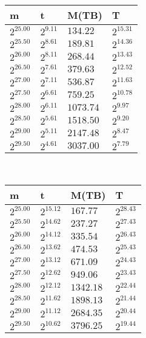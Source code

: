 \begin{tabular}{llll}
m & t & M(TB) & T \\ \hline
$2^{25.00}$ & $2^{9.11}$ & $134.22$ & $2^{15.31}$ \\
$2^{25.50}$ & $2^{8.61}$ & $189.81$ & $2^{14.36}$ \\
$2^{26.00}$ & $2^{8.11}$ & $268.44$ & $2^{13.43}$ \\
$2^{26.50}$ & $2^{7.61}$ & $379.63$ & $2^{12.52}$ \\
$2^{27.00}$ & $2^{7.11}$ & $536.87$ & $2^{11.63}$ \\
$2^{27.50}$ & $2^{6.61}$ & $759.25$ & $2^{10.78}$ \\
$2^{28.00}$ & $2^{6.11}$ & $1073.74$ & $2^{9.97}$ \\
$2^{28.50}$ & $2^{5.61}$ & $1518.50$ & $2^{9.20}$ \\
$2^{29.00}$ & $2^{5.11}$ & $2147.48$ & $2^{8.47}$ \\
$2^{29.50}$ & $2^{4.61}$ & $3037.00$ & $2^{7.79}$ \\
\end{tabular}
 \ 
\begin{tabular}{llll}
m & t & M(TB) & T \\ \hline
$2^{25.00}$ & $2^{15.12}$ & $167.77$ & $2^{28.43}$ \\
$2^{25.50}$ & $2^{14.62}$ & $237.27$ & $2^{27.43}$ \\
$2^{26.00}$ & $2^{14.12}$ & $335.54$ & $2^{26.43}$ \\
$2^{26.50}$ & $2^{13.62}$ & $474.53$ & $2^{25.43}$ \\
$2^{27.00}$ & $2^{13.12}$ & $671.09$ & $2^{24.43}$ \\
$2^{27.50}$ & $2^{12.62}$ & $949.06$ & $2^{23.43}$ \\
$2^{28.00}$ & $2^{12.12}$ & $1342.18$ & $2^{22.44}$ \\
$2^{28.50}$ & $2^{11.62}$ & $1898.13$ & $2^{21.44}$ \\
$2^{29.00}$ & $2^{11.12}$ & $2684.35$ & $2^{20.44}$ \\
$2^{29.50}$ & $2^{10.62}$ & $3796.25$ & $2^{19.44}$ \\
\end{tabular}
 \ 

